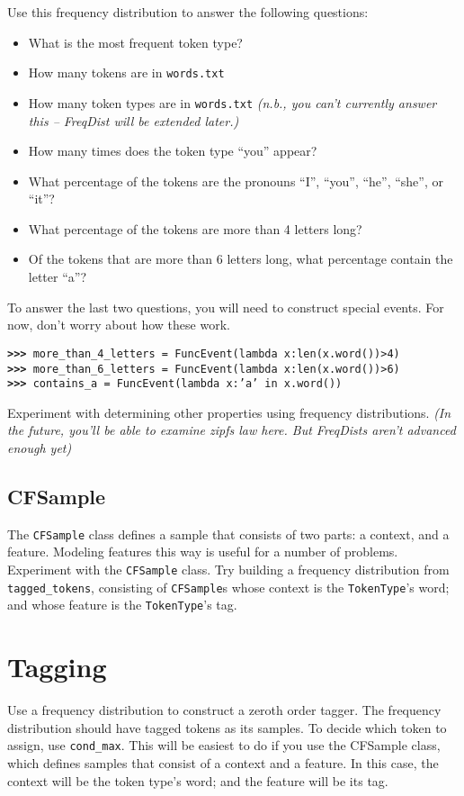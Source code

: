 \documentclass[11pt]{article}
\begin{document}
Use this frequency distribution to answer the following questions: 
\begin{itemize}
  \item What is the most frequent token type?
  \item How many tokens are in \texttt{words.txt}
  \item How many token types are in \texttt{words.txt} \textit{(n.b.,
        you can't currently answer this -- FreqDist will be extended
        later.)}
  \item How many times does the token type ``you'' appear?
  \item What percentage of the tokens are the pronouns ``I'', ``you'',
        ``he'', ``she'', or ``it''?
  \item What percentage of the tokens are more than 4 letters long?
  \item Of the tokens that are more than 6 letters long, what
        percentage contain the letter ``a''?
\end{itemize}

\noindent
To answer the last two questions, you will need to construct special
events.  For now, don't worry about how these work.

\noindent\begin{tabbing}
\tt\textbf{>>>} more\_than\_4\_letters = FuncEvent(lambda x:len(x.word())>4)\\
\tt\textbf{>>>} more\_than\_6\_letters = FuncEvent(lambda x:len(x.word())>6)\\
\tt\textbf{>>>} contains\_a = FuncEvent(lambda x:'a' in x.word())
\end{tabbing}

\noindent
Experiment with determining other properties using frequency
distributions.  \textit{(In the future, you'll be able to examine
zipfs law here.  But FreqDists aren't advanced enough yet)}

\subsection{CFSample}

The \texttt{CFSample} class defines a sample that consists of two
parts: a context, and a feature.  Modeling features this way is useful
for a number of problems.  Experiment with the \texttt{CFSample}
class.  Try building a frequency distribution from
\texttt{tagged\_tokens}, consisting of \texttt{CFSample}s whose
context is the \texttt{TokenType}'s word; and whose feature is the
\texttt{TokenType}'s tag.

\section{Tagging}

Use a frequency distribution to construct a zeroth order tagger.  The
frequency distribution should have tagged tokens as its samples.  To
decide which token to assign, use \texttt{cond\_max}.  This will be
easiest to do if you use the CFSample class, which defines samples
that consist of a context and a feature.  In this case, the context
will be the token type's word; and the feature will be its tag.
\end{document}
